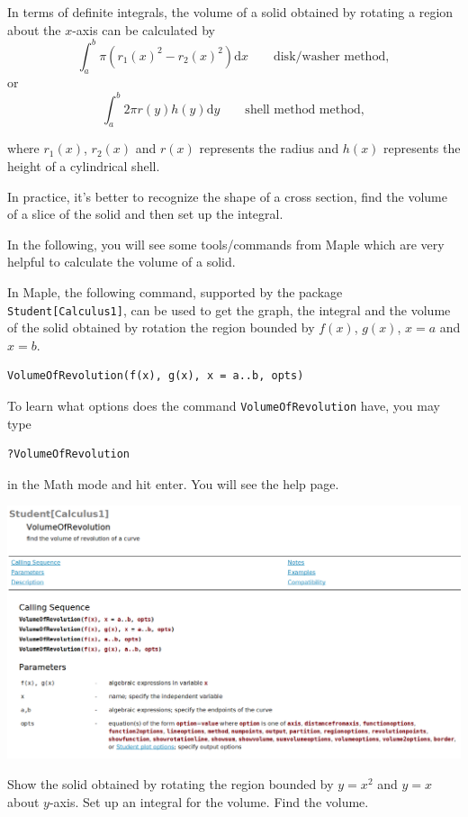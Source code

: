 \documentclass[]{book}
\theoremstyle{definition}
\theoremstyle{definition}
\theoremstyle{definition}
\theoremstyle{remark}
\let\BeginKnitrBlock\begin \let\EndKnitrBlock\end
\begin{document}
In terms of definite integrals, the volume of a solid obtained by rotating a region about the \(x\)-axis can be calculated by
\[\int_a^b \pi (r_1(x)^2 - r_2(x)^2) \mathrm{d} x \qquad \text{disk/washer method},\]
or
\[\int_a^b 2\pi r(y) h(y) \mathrm{d} y \qquad \text{shell method method},\]

where \(r_1(x)\), \(r_2(x)\) and \(r(x)\) represents the radius and \(h(x)\) represents the height of a cylindrical shell.

In practice, it's better to recognize the shape of a cross section, find the volume of a slice of the solid and then set up the integral.

In the following, you will see some tools/commands from Maple which are very helpful to calculate the volume of a solid.

In Maple, the following command, supported by the package \texttt{Student{[}Calculus1{]}}, can be used to get the graph, the integral and the volume of the solid obtained by rotation the region bounded by \(f(x)\), \(g(x)\), \(x=a\) and \(x=b\).

\begin{verbatim}
VolumeOfRevolution(f(x), g(x), x = a..b, opts)
\end{verbatim}

To learn what options does the command \texttt{VolumeOfRevolution} have, you may type

\begin{verbatim}
?VolumeOfRevolution
\end{verbatim}

in the Math mode and hit enter. You will see the help page.

\includegraphics{figs/VolOfRev-help-page.png}

\BeginKnitrBlock{example}
\protect\hypertarget{exm:unnamed-chunk-1}{}{\label{exm:unnamed-chunk-1} }Show the solid obtained by rotating the region bounded by \(y=x^2\) and \(y=x\) about \(y\)-axis. Set up an integral for the volume. Find the volume.
\EndKnitrBlock{example}
\end{document}
